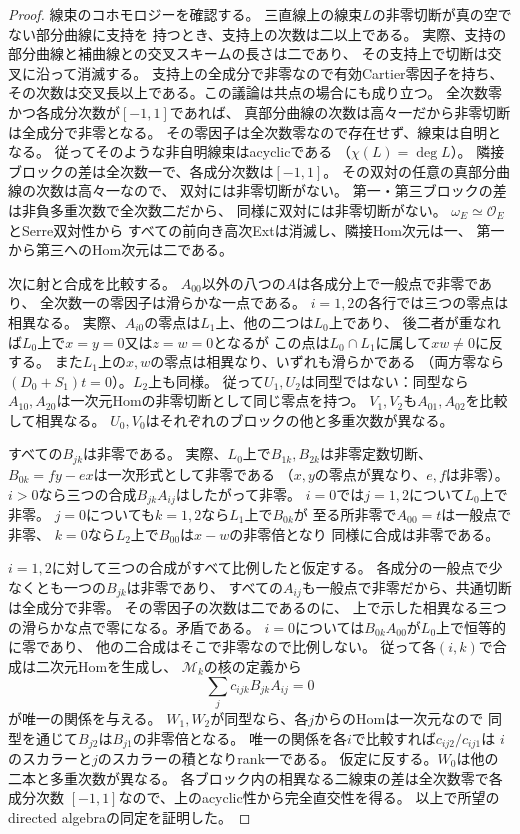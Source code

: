 \begin{proof}
線束のコホモロジーを確認する。
三直線上の線束$L$の非零切断が真の空でない部分曲線に支持を
持つとき、支持上の次数は二以上である。
実際、支持の部分曲線と補曲線との交叉スキームの長さは二であり、
その支持上で切断は交叉に沿って消滅する。
支持上の全成分で非零なので有効Cartier零因子を持ち、
その次数は交叉長以上である。この議論は共点の場合にも成り立つ。
全次数零かつ各成分次数が$[-1,1]$であれば、
真部分曲線の次数は高々一だから非零切断は全成分で非零となる。
その零因子は全次数零なので存在せず、線束は自明となる。
従ってそのような非自明線束はacyclicである
（$\chi(L)=\deg L$）。
隣接ブロックの差は全次数一で、各成分次数は$[-1,1]$。
その双対の任意の真部分曲線の次数は高々一なので、
双対には非零切断がない。
第一・第三ブロックの差は非負多重次数で全次数二だから、
同様に双対には非零切断がない。
$\omega_E\simeq\mathcal O_E$とSerre双対性から
すべての前向き高次Extは消滅し、隣接Hom次元は一、
第一から第三へのHom次元は二である。

次に射と合成を比較する。
$A_{00}$以外の八つの$A$は各成分上で一般点で非零であり、
全次数一の零因子は滑らかな一点である。
$i=1,2$の各行では三つの零点は相異なる。
実際、$A_{i0}$の零点は$L_1$上、他の二つは$L_0$上であり、
後二者が重なれば$L_0$上で$x=y=0$又は$z=w=0$となるが
この点は$L_0\cap L_1$に属して$xw\ne0$に反する。
また$L_1$上の$x,w$の零点は相異なり、いずれも滑らかである
（両方零なら$(D_0+S_1)t=0$）。$L_2$上も同様。
従って$U_1,U_2$は同型ではない：同型なら
$A_{10},A_{20}$は一次元Homの非零切断として同じ零点を持つ。
$V_1,V_2$も$A_{01},A_{02}$を比較して相異なる。
$U_0,V_0$はそれぞれのブロックの他と多重次数が異なる。

すべての$B_{jk}$は非零である。
実際、$L_0$上で$B_{1k},B_{2k}$は非零定数切断、
$B_{0k}=fy-ex$は一次形式として非零である
（$x,y$の零点が異なり、$e,f$は非零）。
$i>0$なら三つの合成$B_{jk}A_{ij}$はしたがって非零。
$i=0$では$j=1,2$について$L_0$上で非零。
$j=0$についても$k=1,2$なら$L_1$上で$B_{0k}$が
至る所非零で$A_{00}=t$は一般点で非零、
$k=0$なら$L_2$上で$B_{00}$は$x-w$の非零倍となり
同様に合成は非零である。

$i=1,2$に対して三つの合成がすべて比例したと仮定する。
各成分の一般点で少なくとも一つの$B_{jk}$は非零であり、
すべての$A_{ij}$も一般点で非零だから、共通切断は全成分で非零。
その零因子の次数は二であるのに、
上で示した相異なる三つの滑らかな点で零になる。矛盾である。
$i=0$については$B_{0k}A_{00}$が$L_0$上で恒等的に零であり、
他の二合成はそこで非零なので比例しない。
従って各$(i,k)$で合成は二次元Homを生成し、
$\mathscr M_k$の核の定義から
\[
 \sum_j c_{ijk}B_{jk}A_{ij}=0
\]
が唯一の関係を与える。
$W_1,W_2$が同型なら、各$j$からのHomは一次元なので
同型を通じて$B_{j2}$は$B_{j1}$の非零倍となる。
唯一の関係を各$i$で比較すれば$c_{ij2}/c_{ij1}$は
$i$のスカラーと$j$のスカラーの積となりrank一である。
仮定に反する。$W_0$は他の二本と多重次数が異なる。
各ブロック内の相異なる二線束の差は全次数零で各成分次数
$[-1,1]$なので、上のacyclic性から完全直交性を得る。
以上で所望のdirected algebraの同定を証明した。
\end{proof}


